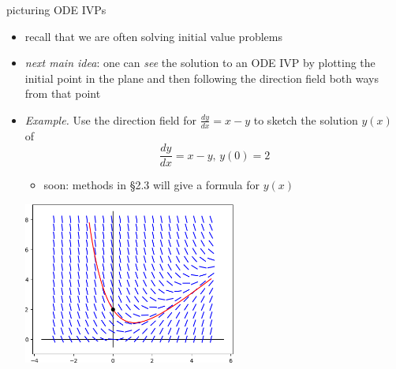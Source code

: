 \documentclass{beamer}
\begin{document}
\begin{frame}{picturing ODE IVPs}

\begin{itemize}
\item recall that we are often solving initial value problems
\item \emph{next main idea}:  one can \emph{see} the solution to an ODE IVP by plotting the initial point in the plane and then following the direction field both ways from that point

\bigskip
\item \begin{minipage}[t]{0.32\textwidth} \small
\emph{Example.}  Use the direction field for
$\frac{dy}{dx} = x-y$ to sketch the solution $y(x)$ of
    $$\frac{dy}{dx} = x-y, \, y(0)=2$$

    \begin{itemize}
    \item soon: methods in \S 2.3 will give a formula for $y(x)$
    \end{itemize}
\end{minipage}

\vspace{-45mm}
\hfill \includegraphics[width=0.55\textwidth]{figs/example-field-solution}
\end{itemize}
\end{frame}
\end{document}
